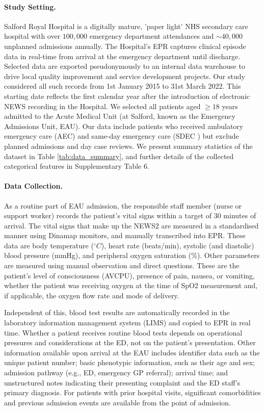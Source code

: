 \documentclass[fleqn,10pt]{wlscirep}
\begin{document}
\paragraph{Study Setting.} Salford Royal Hospital is a digitally mature, 'paper light' NHS secondary care hospital with over $100,000$ emergency department attendances and $\sim 40,000$ unplanned admissions annually. The Hospital's EPR captures clinical episode data in real-time from arrival at the emergency department until discharge. Selected data are exported pseudonymously to an internal data warehouse to drive local quality improvement and service development projects. Our study considered all such records from 1st January 2015 to 31st March 2022. This starting date reflects the first calendar year after the introduction of electronic NEWS recording in the Hospital. We selected all patients aged $\geq 18$ years admitted to the Acute Medical Unit (at Salford, known as the Emergency Admissions Unit, EAU). Our data include patients who received ambulatory emergency care (AEC) and same-day emergency care (SDEC \cite{NHS18}) but exclude planned admissions and day case reviews. We present summary statistics of the dataset in Table \ref{tab:data_summary}, and further details of the collected categorical features in Supplementary Table 6.

\paragraph{Data Collection.} As a routine part of EAU admission, the responsible staff member (nurse or support worker) records the patient's vital signs within a target of 30 minutes of arrival. The vital signs that make up the NEWS2 \cite{RCP17} are measured in a standardised manner using Dinamap monitors, and manually transcribed into EPR. These data are body temperature ($^{\circ}C$), heart rate (beats/min), systolic (and diastolic) blood pressure (mmHg), and peripheral oxygen saturation ($\%$). Other parameters are measured using manual observation and direct questions. These are the patient's level of consciousness (AVCPU), presence of pain, nausea, or vomiting, whether the patient was receiving oxygen at the time of SpO2 measurement and, if applicable, the oxygen flow rate and mode of delivery.

Independent of this, blood test results are automatically recorded in the laboratory information management system (LIMS) and copied to EPR in real time. Whether a patient receives routine blood tests depends on operational pressures and considerations at the ED, not on the patient's presentation. Other information available upon arrival at the EAU includes identifier data such as the unique patient number; basic phenotypic information, such as their age and sex; admission pathway (e.g., ED, emergency GP referral); arrival time; and unstructured notes indicating their presenting complaint and the ED staff's primary diagnosis. For patients with prior hospital visits, significant comorbidities and previous admission events are available from the point of admission.
\end{document}
